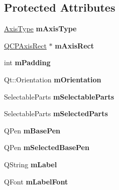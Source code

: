 \subsection*{\-Protected \-Attributes}
\begin{DoxyCompactItemize}
\item 
\hypertarget{classQCPAxis_ae704bf9f2c2b026f08dd4ccad79c616e}{\hyperlink{classQCPAxis_ae2bcc1728b382f10f064612b368bc18a}{\-Axis\-Type} {\bfseries m\-Axis\-Type}}\label{classQCPAxis_ae704bf9f2c2b026f08dd4ccad79c616e}

\item 
\hypertarget{classQCPAxis_a6f150b65a202f32936997960e331dfcb}{\hyperlink{classQCPAxisRect}{\-Q\-C\-P\-Axis\-Rect} $\ast$ {\bfseries m\-Axis\-Rect}}\label{classQCPAxis_a6f150b65a202f32936997960e331dfcb}

\item 
\hypertarget{classQCPAxis_a52a805a4f03231210e0880db7f77e098}{int {\bfseries m\-Padding}}\label{classQCPAxis_a52a805a4f03231210e0880db7f77e098}

\item 
\hypertarget{classQCPAxis_a048e1792fa86f4f86df55200b3f0be36}{\-Qt\-::\-Orientation {\bfseries m\-Orientation}}\label{classQCPAxis_a048e1792fa86f4f86df55200b3f0be36}

\item 
\hypertarget{classQCPAxis_ab9042d8a095998f27a28b39411d8b9c3}{\-Selectable\-Parts {\bfseries m\-Selectable\-Parts}}\label{classQCPAxis_ab9042d8a095998f27a28b39411d8b9c3}

\item 
\hypertarget{classQCPAxis_a8f1eb0abfe2ae64652aa46b360e841e4}{\-Selectable\-Parts {\bfseries m\-Selected\-Parts}}\label{classQCPAxis_a8f1eb0abfe2ae64652aa46b360e841e4}

\item 
\hypertarget{classQCPAxis_ad6b4a0aee9558fb35529e960b8fef72d}{\-Q\-Pen {\bfseries m\-Base\-Pen}}\label{classQCPAxis_ad6b4a0aee9558fb35529e960b8fef72d}

\item 
\hypertarget{classQCPAxis_a80baa4e3c16f9b6edf3eccacd2a50fde}{\-Q\-Pen {\bfseries m\-Selected\-Base\-Pen}}\label{classQCPAxis_a80baa4e3c16f9b6edf3eccacd2a50fde}

\item 
\hypertarget{classQCPAxis_ae8001dbdfc47685c1cf7b98b044460e6}{\-Q\-String {\bfseries m\-Label}}\label{classQCPAxis_ae8001dbdfc47685c1cf7b98b044460e6}

\item 
\hypertarget{classQCPAxis_a37442d470e30e19b81ecaf979a34d046}{\-Q\-Font {\bfseries m\-Label\-Font}}\label{classQCPAxis_a37442d470e30e19b81ecaf979a34d046}


\end{DoxyCompactItemize}
